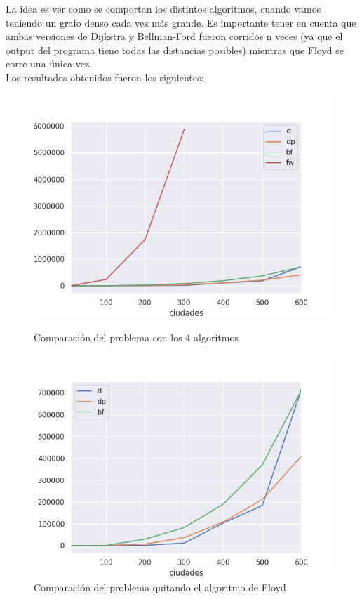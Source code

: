 La idea es ver como se comportan los distintos algoritmos, cuando vamos teniendo un grafo denso cada vez más grande. Es importante tener en cuenta que ambas versiones de Dijkstra y Bellman-Ford fueron corridos n veces (ya que el output del programa tiene todas las distancias posibles) mientras que Floyd se corre una única vez. \\
Los resultados obtenidos fueron los siguientes:
\begin{figure}[H]
   \begin{minipage}{0.5\textwidth}
     \centering
     \includegraphics[width=1\linewidth]{img/exp1_2.png}
     \caption{Comparación del problema con los 4 algoritmos}
   \end{minipage}\hfill
   \begin{minipage}{0.5\textwidth}
     \centering
     \includegraphics[width=1\linewidth]{img/exp1_1.png}
     \caption{Comparación del problema quitando el algoritmo de Floyd}
   \end{minipage}
\end{figure}


